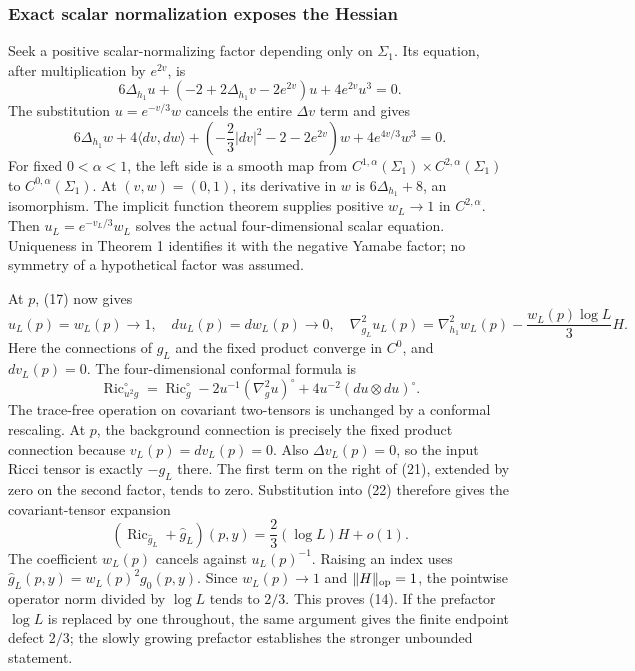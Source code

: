 \documentclass[
  11pt,
]{article}
\begin{document}
\hypertarget{exact-scalar-normalization-exposes-the-hessian}{%
\subsubsection{Exact scalar normalization exposes the
Hessian}\label{exact-scalar-normalization-exposes-the-hessian}}

Seek a positive scalar-normalizing factor depending only on
\(\Sigma_1\). Its equation, after multiplication by \(e^{2v}\), is \[
 6\Delta_{h_1}u+(-2+2\Delta_{h_1}v-2e^{2v})u+4e^{2v}u^3=0.
 \tag{19}
\] The substitution \(u=e^{-v/3}w\) cancels the entire \(\Delta v\) term
and gives \[
 6\Delta_{h_1}w+4\langle dv,dw\rangle
  +\left(-\frac23|dv|^2-2-2e^{2v}\right)w
  +4e^{4v/3}w^3=0.
 \tag{20}
\] For fixed \(0<\alpha<1\), the left side is a smooth map from
\(C^{1,\alpha}(\Sigma_1)\times C^{2,\alpha}(\Sigma_1)\) to
\(C^{0,\alpha}(\Sigma_1)\). At \((v,w)=(0,1)\), its derivative in \(w\)
is \(6\Delta_{h_1}+8\), an isomorphism. The implicit function theorem
supplies positive \(w_L\to1\) in \(C^{2,\alpha}\). Then
\(u_L=e^{-v_L/3}w_L\) solves the actual four-dimensional scalar
equation. Uniqueness in Theorem 1 identifies it with the negative Yamabe
factor; no symmetry of a hypothetical factor was assumed.

At \(p\), (17) now gives \[
 u_L(p)=w_L(p)\to1,\quad du_L(p)=dw_L(p)\to0,\quad
 \nabla_{g_L}^2u_L(p)
 =\nabla_{h_1}^2w_L(p)-\frac{w_L(p)\log L}{3}H.
 \tag{21}
\] Here the connections of \(g_L\) and the fixed product converge in
\(C^0\), and \(dv_L(p)=0\). The four-dimensional conformal formula is \[
 \operatorname{Ric}^{\circ}_{u^2g}
 =\operatorname{Ric}^{\circ}_g
       -2u^{-1}(\nabla_g^2u)^\circ
       +4u^{-2}(du\otimes du)^\circ.
 \tag{22}
\] The trace-free operation on covariant two-tensors is unchanged by a
conformal rescaling. At \(p\), the background connection is precisely
the fixed product connection because \(v_L(p)=dv_L(p)=0\). Also
\(\Delta v_L(p)=0\), so the input Ricci tensor is exactly \(-g_L\)
there. The first term on the right of (21), extended by zero on the
second factor, tends to zero. Substitution into (22) therefore gives the
covariant-tensor expansion \[
 (\operatorname{Ric}_{\widehat g_L}+\widehat g_L)(p,y)
       =\frac23(\log L)H+o(1).
\] The coefficient \(w_L(p)\) cancels against \(u_L(p)^{-1}\). Raising
an index uses \(\widehat g_L(p,y)=w_L(p)^2g_0(p,y)\). Since
\(w_L(p)\to1\) and \(\|H\|_{\rm op}=1\), the pointwise operator norm
divided by \(\log L\) tends to \(2/3\). This proves (14). If the
prefactor \(\log L\) is replaced by one throughout, the same argument
gives the finite endpoint defect \(2/3\); the slowly growing prefactor
establishes the stronger unbounded statement.
\end{document}
